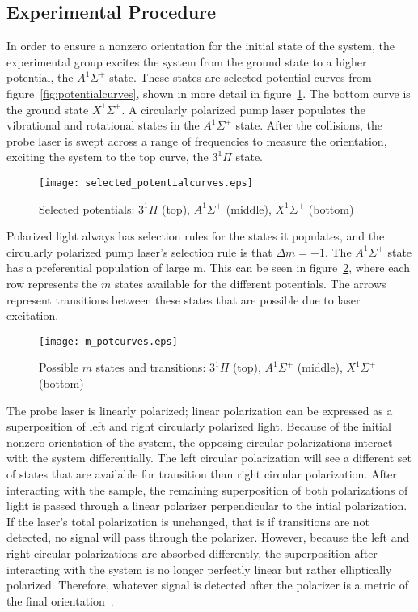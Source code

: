 \documentclass[letterpaper,titlepage,12pt]{article}
\begin{document}
\subsection{Experimental Procedure}
In order to ensure a nonzero orientation for the initial state of the system,
the experimental group excites the system from the ground state to a higher
potential, the $A^1\Sigma^+$ state.  These states are selected potential curves
from figure~\ref{fig:potentialcurves}, shown in more detail in
figure~\ref{fig:selected_potcurves}.  The bottom curve is the ground state
$X^1\Sigma^+$.  A circularly polarized pump laser populates the vibrational and
rotational states in the $A^1\Sigma^+$ state.  After the collisions, the probe
laser is swept across a range of frequencies to measure the orientation,
exciting the system to the top curve, the $3^1\Pi$ state.
\begin{figure}[ht]
    \centering
    \texttt{[image: selected\_potentialcurves.eps]}
    \caption{Selected potentials: $3^1\Pi$ (top), $A^1\Sigma^+$ (middle), $X^1\Sigma^+$ (bottom)}
\label{fig:selected_potcurves}
\end{figure}

Polarized light always has selection rules for the states it populates, and the
circularly polarized pump laser's selection rule is that $\Delta m=+1$.  The
$A^1\Sigma^+$ state has a preferential population of large m.  This can be seen
in figure~\ref{fig:m_potcurves}, where each row represents the $m$ states
available for the different potentials.  The arrows represent transitions
between these states that are possible due to laser excitation.
\begin{figure}[ht]
    \centering
    \texttt{[image: m\_potcurves.eps]}
    \caption{Possible $m$ states and transitions: $3^1\Pi$ (top), $A^1\Sigma^+$ (middle), $X^1\Sigma^+$ (bottom)}
\label{fig:m_potcurves}
\end{figure}

The probe laser is linearly polarized; linear polarization can be expressed as
a superposition of left and right circularly polarized light.  Because of the
initial nonzero orientation of the system, the opposing circular polarizations
interact with the system differentially.  The left circular polarization will
see a different set of states that are available for transition than right
circular polarization.  After interacting with the sample, the remaining
superposition of both polarizations of light is passed through a linear
polarizer perpendicular to the intial polarization.  If the laser's total
polarization is unchanged, that is if transitions are not detected, no signal
will pass through the polarizer.  However, because the left and right circular
polarizations are absorbed differently, the superposition after interacting
with the system is no longer perfectly linear but rather elliptically
polarized.  Therefore, whatever signal is detected after the polarizer is a
metric of the final orientation~\cite{Jon15}.
\end{document}
